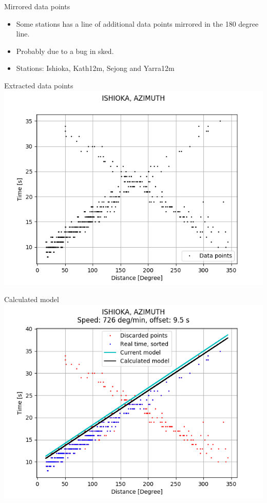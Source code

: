 \documentclass{beamer}
\begin{document}
    \begin{frame}{Mirrored data points}
        \begin{itemize}[<+-|alert@+>]
            \item Some stations has a line of additional data points mirrored
            in the 180 degree line.
            \item Probably due to a bug in sked.
            \item Stations: Ishioka, Kath12m, Sejong and Yarra12m
        \end{itemize}
    \end{frame}
    \begin{frame}{Extracted data points}
        \centering
        \includegraphics[width=1\columnwidth]{ISHIOKA_AZIMUT_DATA}
    \end{frame}
    \begin{frame}{Calculated model}
        \centering
        \includegraphics[width=1\columnwidth]{ISHIOKA_AZIMUT}
    \end{frame}
\end{document}
